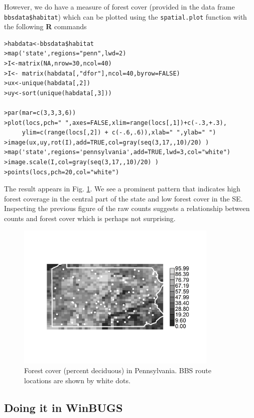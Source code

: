 However, we do have a measure of forest cover (provided in the data frame
\mbox{\tt bbsdata\$habitat}) which can be plotted using the 
\mbox{\tt spatial.plot} function with the following {\bf R} commands
{\small
\begin{verbatim}
>habdata<-bbsdata$habitat
>map('state',regions="penn",lwd=2)
>I<-matrix(NA,nrow=30,ncol=40)
>I<- matrix(habdata[,"dfor"],ncol=40,byrow=FALSE)
>ux<-unique(habdata[,2])
>uy<-sort(unique(habdata[,3]))

>par(mar=c(3,3,3,6))
>plot(locs,pch=" ",axes=FALSE,xlim=range(locs[,1])+c(-.3,+.3),
     ylim=c(range(locs[,2]) + c(-.6,.6)),xlab=" ",ylab=" ")
>image(ux,uy,rot(I),add=TRUE,col=gray(seq(3,17,,10)/20) )
>map('state',regions='pennsylvania',add=TRUE,lwd=3,col="white")
>image.scale(I,col=gray(seq(3,17,,10)/20) )
>points(locs,pch=20,col="white")
\end{verbatim}
}
{\flushleft The} result appears in Fig. \ref{glms.fig.paforest}.
We see a prominent pattern that indicates high forest coverage in the
central part of the state and low forest cover in the SE.  Inspecting
the previous figure of the raw counts suggests a relationship between
counts and forest cover which is perhaps not surprising.
\begin{figure}
\begin{center}
\includegraphics[height=2.75in]{Ch3-Bayes/figs/paforest}
\end{center}
\caption{Forest cover (percent deciduous) in Pennsylvania. BBS route
  locations are shown by white dots. }
\label{glms.fig.paforest}
\end{figure}

\subsection{Doing it in WinBUGS}

